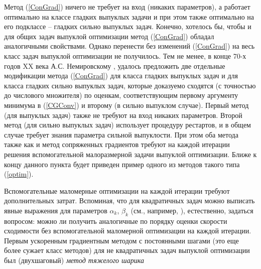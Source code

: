   \iffalse
  Метод (\ref{ConGrad}) ничего не требует на вход (никаких параметров), а работает оптимально на классе гладких выпуклых задачи и при этом также оптимально на его подклассе -- гладких сильно выпуклых задач. Конечно, хотелось бы, чтобы и для общих задач выпуклой оптимизации метод (\ref{ConGrad}) обладал аналогичными свойствами. Однако перенести без изменений (\ref{ConGrad}) на весь класс задач выпуклой оптимизации не получилось. Тем не менее, в конце 70-х годов XX века А.С. Немировскому \cite{Nemirovski1979}, \cite{narkiss2005sequential}  удалось предложить две отдельные модификации метода (\ref{ConGrad}) для класса гладких выпуклых задач и для класса 
  гладких сильно выпуклых задач, которые доказуемо сходятся (с точностью до числового множителя) по оценкам, соответствующим первому аргументу минимума в (\ref{CGConv}) и второму (в сильно выпуклом случае). Первый метод (для выпуклых задач) также не требуют на вход никаких параметров. Второй метод (для сильно выпуклых задач) использует процедуру рестартов, и в общем случае требует знания параметра сильной выпуклости. При этом оба метода также как и метод сопряженных градиентов требуют на каждой итерации решения вспомогательной малоразмерной задачи выпуклой оптимизации. Ближе к концу данного пункта будет приведен пример одного из методов такого типа (\ref{optim}).

  Вспомогательные маломерные оптимизации на каждой итерации требуют дополнительных затрат. Вспоминая, что для квадратичных задач можно выписать явные выражения для параметров $\alpha_k$, $\beta_k$ (см., например, \cite{Polyak1983}), естественно, задаться вопросом: можно ли получить аналогичные по порядку оценки скорости сходимости без вспомогательной маломерной оптимизации на каждой итерации. Первым ускоренным градиентным методом с постоянными шагами (это еще более сужает класс методов) для не квадратичных задач выпуклой оптимизации был (двухшаговый) \textit{метод тяжелого шарика}

